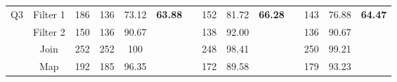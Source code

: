 \begin{table}
\begin{tabular}{cccccclccclccc}
\multirow{4}{*}{Q3}             & Filter 1                            & 186                                   & 136                                                                    & 73.12                                                                     & \multirow{4}{*}{\textbf{63.88}} &                      & 152                                                                    & 81.72                                                                     & \multirow{4}{*}{\textbf{66.28}} &                      & 143                                                                    & 76.88                                                                     & \multirow{4}{*}{\textbf{64.47}} \\
                                & Filter 2                            & 150                                   & 136                                                                    & 90.67                                                                     &                                 & \multicolumn{1}{c}{} & 138                                                                    & 92.00                                                                     &                                 & \multicolumn{1}{c}{} & 136                                                                    & 90.67                                                                     &                                 \\
                                & Join                                & 252                                   & 252                                                                    & 100                                                                       &                                 & \multicolumn{1}{c}{} & 248                                                                    & 98.41                                                                     &                                 & \multicolumn{1}{c}{} & 250                                                                    & 99.21                                                                     &                                 \\
                                & Map                                 & 192                                   & 185                                                                    & 96.35                                                                     &                                 & \multicolumn{1}{c}{} & 172                                                                    & 89.58                                                                     &                                 & \multicolumn{1}{c}{} & 179                                                                    & 93.23                                                                     &                                 \\ \hline

\end{tabular}
\end{table}
